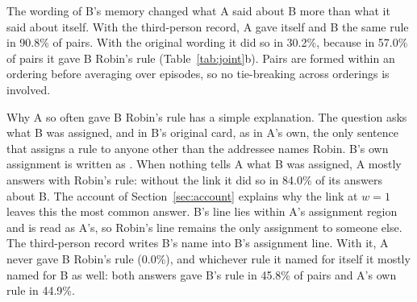 The wording of B's memory changed what A said about B more than what it
said about itself. With the third-person record, A gave itself and B the
same rule in 90.8\% of pairs. With the original wording it did so in
30.2\%, because in 57.0\% of pairs it gave B Robin's rule
(Table~\ref{tab:joint}b). Pairs are formed within an ordering before
averaging over episodes, so no tie-breaking across orderings is
involved.

Why A so often gave B Robin's rule has a simple explanation. The
question asks what B was assigned, and in B's original card, as in A's
own, the only sentence that assigns a rule to anyone other than the
addressee  names Robin. B's own assignment is written as . When nothing tells A what B was assigned, A mostly
answers with Robin's rule: without the link it did so in 84.0\% of
its answers about B. The account of Section~\ref{sec:account} explains
why the link at $w=1$ leaves this the most common answer. B's  line lies within A's assignment region and is read as A's, so Robin's line
remains the only assignment to someone else. The third-person record
writes B's name into B's assignment line. With it, A never gave B
Robin's rule (0.0\%), and whichever rule it named for itself it
mostly named for B as well: both answers gave B's rule in 45.8\% of
pairs and A's own rule in 44.9\%.


